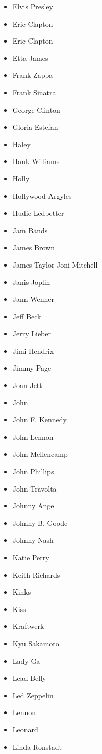 \documentclass[12pt,a4paper]{article}
\begin{document}
\begin{itemize}
  \item Elvis Presley
  \item Eric Clapton
  \item Eric Clapton
  \item Etta James
  \item Frank Zappa
  \item Frank Sinatra
  \item George Clinton
  \item Gloria Estefan
  \item Haley
  \item Hank Williams
  \item Holly
  \item Hollywood Argyles
  \item Hudie Ledbetter
  \item Jam Bands
  \item James Brown
  \item James Taylor Joni Mitchell
  \item Janis Joplin
  \item Jann Wenner
  \item Jeff Beck
  \item Jerry Lieber
  \item Jimi Hendrix
  \item Jimmy Page
  \item Joan Jett
  \item John
  \item John F. Kennedy
  \item John Lennon
  \item John Mellencamp
  \item John Phillips
  \item John Travolta
  \item Johnny Ange
  \item Johnny B. Goode
  \item Johnny Nash
  \item Katie Perry
  \item Keith Richards
  \item Kinks
  \item Kiss
  \item Kraftwerk
  \item Kyu Sakamoto
  \item Lady Ga
  \item Lead Belly
  \item Led Zeppelin
  \item Lennon
  \item Leonard
  \item Linda Ronstadt

\end{itemize}
\end{document}
